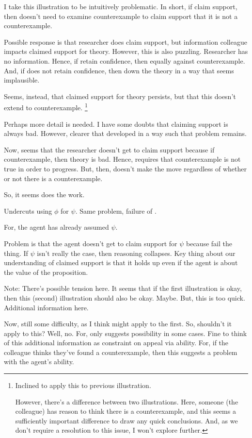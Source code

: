 \begin{note}
  I take this illustration to be intuitively problematic.
  In short, if claim support, then doesn't need to examine counterexample to claim support that it is not a counterexample.

  Possible response is that researcher does claim support, but information colleague impacts claimed support for theory.
  However, this is also puzzling.
  Researcher has no information.
  Hence, if retain confidence, then equally against counterexample.
  And, if does not retain confidence, then down the theory in a way that seems implausible.

  Seems, instead, that claimed support for theory persists, but that this doesn't extend to counterexample.\nolinebreak
  \footnote{
    Inclined to apply this to previous illustration.

    However, there's a difference between two illustrations.
    Here, someone (the colleague) has reason to think there is a counterexample, and this seems a sufficiently important difference to draw any quick conclusions.
    And, as we don't require a resolution to this issue, I won't explore further.
  }

  Perhaps more detail is needed.
  I have some doubts that claiming support is always bad.
  However, clearer that developed in a way such that problem remains.

  Now, seems that the researcher doesn't get to claim support because if counterexample, then theory is bad.
  Hence, requires that counterexample is not true in order to progress.
  But, then, doesn't make the move regardless of whether or not there is a counterexample.

  So, it seems \eiS{} does the work.
\end{note}


\begin{note}
  Undercuts using \(\phi\) for \(\psi\).
  Same problem, failure of \eiS{}.

  For, the agent has already assumed \(\psi\).

  Problem is that the agent doesn't get to claim support for \(\psi\) because fail the \eiS{} thing.
  If \(\psi\) isn't really the case, then reasoning collapses.
  Key thing about our understanding of claimed support is that it holds up even if the agent is \mom{} about the value of the proposition.

  {
    \color{red}
    Note:
    There's possible tension here.
    It seems that if the first illustration is okay, then this (second) illustration should also be okay.
    Maybe.
    But, this is too quick.
    Additional information here.

    Now, still some difficulty, as I think \EAS{} might apply to the first.
    So, shouldn't it apply to this?
    Well, no.
    For, \EAS{} only suggests possibility in some cases.
    Fine to think of this additional information as constraint on appeal via ability.
    For, if the colleague thinks they've found a counterexample, then this suggests a problem with the agent's ability.
  }
\end{note}

